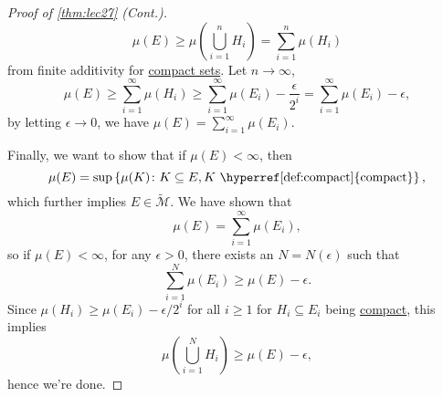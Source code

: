 \begin{proof}[Proof of \autoref{thm:lec27} (Cont.)]
	\[
		\mu (E) \geq \mu \left( \bigcup_{i=1}^{n} H_i \right) = \sum_{i=1}^{n} \mu (H_i)
	\]
	from finite additivity for \hyperref[def:compact]{compact sets}. Let \(n \to \infty \),
	\[
		\mu (E)
		\geq \sum_{i=1}^{\infty} \mu (H_i)
		\geq \sum_{i=1}^{\infty} \mu (E_i) - \frac{\epsilon}{2^i}
		= \sum_{i=1}^{\infty} \mu (E_i) - \epsilon,
	\]
	by letting \(\epsilon \to 0\), we have \(\mu (E) = \sum_{i=1}^{\infty} \mu (E_i)\).

	Finally, we want to show that if \(\mu (E) < \infty \), then
	\[
		\mu (E) = \sup \left\{ \mu (K)\colon K \subseteq E, K \text{ \hyperref[def:compact]{compact}}  \right\},
	\]
	which further implies \(E\in \widetilde{\mathcal{M}} \). We have shown that
	\[
		\mu (E) = \sum_{i=1}^{\infty} \mu (E_i),
	\]
	so if \(\mu (E) < \infty \), for any \(\epsilon > 0\), there exists an \(N = N(\epsilon )\) such that
	\[
		\sum_{i=1}^{N} \mu (E_i) \geq \mu (E) - \epsilon .
	\]
	Since \(\mu (H_i) \geq \mu (E_i) - \epsilon / 2^i\) for all \(i \geq 1\) for \(H_i \subseteq E_i\) being \hyperref[def:compact]{compact}, this implies
	\[
		\mu \left( \bigcup_{i=1}^{N} H_i \right) \geq \mu (E) - \epsilon,
	\]
	hence we're done.
\end{proof}

